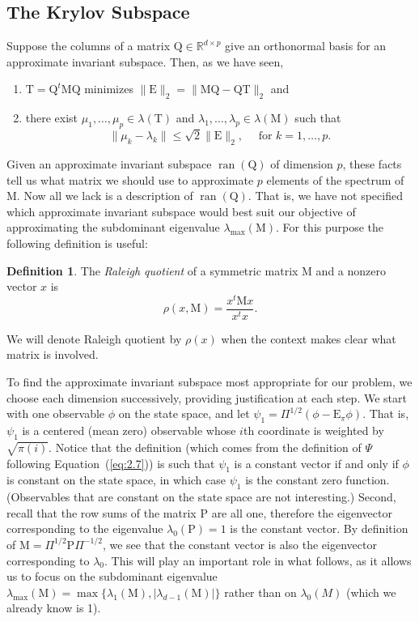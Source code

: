 \documentclass[12pt,letterpaper]{report}
\theoremstyle{plain}
\theoremstyle{definition}
\newtheorem{definition}[theorem]{Definition}
\theoremstyle{remark}
\numberwithin{theorem}{chapter}
\numberwithin{claim}{chapter}
\numberwithin{equation}{chapter}
\numberwithin{conjecture}{chapter}
\newcommand\R{\ensuremath{\mathbb{R}}}
\renewcommand\P{\ensuremath{\mathrm{P}}}
\newcommand\M{\ensuremath{\mathrm{M}}}
\newcommand\T{\ensuremath{\mathrm{T}}}
\newcommand\Q{\ensuremath{\mathrm{Q}}}
\newcommand\E{\ensuremath{\mathrm{E}}}
\newcommand\ran{\ensuremath{\operatorname{ran}}}
\newcommand\<{\ensuremath{\langle}}
\renewcommand\>{\ensuremath{\rangle}}
\begin{document}
\subsection{The Krylov Subspace}
\label{sec:krylov-subspace}
Suppose the columns of a matrix $\Q \in \R^{d\times p}$ give an orthonormal
basis for an approximate invariant subspace. Then, as we have seen, 
\begin{enumerate}
\item 
$\T = \Q^t\M\Q$ minimizes $\|\E\|_2 = \|\M\Q - \Q\T\|_2$ and
\item there exist $\mu_1, \dots, \mu_p\in \lambda(\T)$ and 
$\lambda_1,\dots, \lambda_p \in \lambda(\M)$ such that
\[
\|\mu_k-\lambda_k\| \leq \sqrt{2}\|\E\|_2, \quad \text{ for $k=1,\dots, p$.}
\]
\end{enumerate}
%
%
%
%
Given an approximate invariant subspace $\ran(\Q)$ of dimension $p$, these facts
tell us what matrix we should use to approximate $p$ elements of the spectrum of
$\M$. Now all we lack is a description of $\ran(\Q)$. 
That is, we have not specified which approximate invariant subspace would best
suit our objective of approximating the subdominant eigenvalue
$\lambda_{\max}(\M)$. For this purpose the following definition is useful:
\begin{definition}
The \emph{Raleigh quotient} of a symmetric matrix $\M$ and a nonzero vector $x$ is
\[
\rho(x, \M) = \frac{x^t\M x}{x^tx}.
\]
\end{definition}
We will denote Raleigh quotient by $\rho(x)$ when the context makes clear what
matrix is involved. 

To find the approximate invariant subspace most appropriate for our problem, we
choose each dimension successively, providing justification at each step. 
We start with one observable $\phi$ on the state space, and let 
$\psi_1 = \Pi^{1/2}(\phi -\E_\pi\phi)$. That is, $\psi_1$ is a centered (mean
zero) observable whose $i$th coordinate is weighted by $\sqrt{\pi(i)}$. 
Notice that the definition 
(which comes from the definition of $\Psi$ following Equation~(\ref{eq:2.7})) 
is such that $\psi_1$ is a constant vector if and only if $\phi$ is constant on the
state space, in which case $\psi_1$ is the constant zero function. 
(Observables that are constant on the state space are not interesting.) 
Second, recall that the row sums of the matrix $\P$ are all one, therefore the
eigenvector corresponding to the eigenvalue $\lambda_0(\P) = 1$ is the constant
vector.  By definition of $\M = \Pi^{1/2}\P\Pi^{-1/2}$, we see that the constant
vector is also the eigenvector corresponding to $\lambda_0$.  This will play an
important role in what follows, as it allows us to focus %
on the subdominant eigenvalue 
$\lambda_{\max}(\M) = \max\{\lambda_1(\M), |\lambda_{d-1}(\M)|\}$
rather than on $\lambda_0(M)$ (which we already know is 1).
\end{document}
